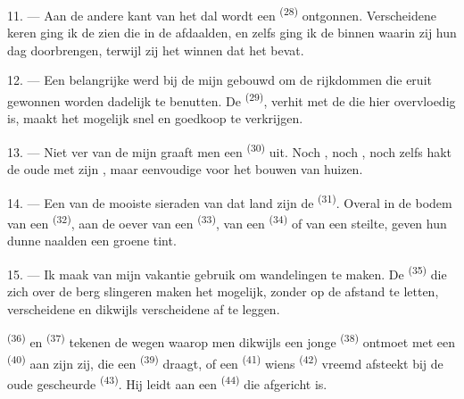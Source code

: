 11. --- Aan de andere kant van het dal wordt een  \textsuperscript{(28)}
ontgonnen. Verscheidene keren ging ik de  zien die in de 
afdaalden, en zelfs ging ik de  binnen waarin zij hun dag doorbrengen, terwijl
zij het  winnen dat het  bevat.

12. --- Een belangrijke  werd bij de mijn gebouwd om de rijkdommen die
eruit gewonnen worden dadelijk te benutten. De
 \textsuperscript{(29)}, verhit met de  die
hier overvloedig is, maakt het mogelijk snel en goedkoop  te verkrijgen.

13. --- Niet ver van de mijn graaft men een  \textsuperscript{(30)} uit.
Noch , noch , noch zelfs  hakt de oude
 met zijn
, maar eenvoudige  voor het bouwen van
huizen.

14. --- Een van de mooiste sieraden van dat land zijn de 
\textsuperscript{(31)}. Overal in de bodem van een  \textsuperscript{(32)}, aan
de oever van een  \textsuperscript{(33)}, van een 
\textsuperscript{(34)} of van een steilte, geven hun dunne naalden een groene tint.

\VUsaut{3.0mm}
\VUsaut{3.0mm}

15. --- Ik maak van mijn vakantie gebruik om  wandelingen te maken. De
 \textsuperscript{(35)} die zich over de berg slingeren maken het mogelijk,
zonder op de afstand te letten, verscheidene  en dikwijls verscheidene
 af te leggen.

 \textsuperscript{(36)} en 
\textsuperscript{(37)} tekenen de wegen waarop men dikwijls een jonge
 \textsuperscript{(38)} ontmoet met een 
\textsuperscript{(40)} aan zijn zij, die een  \textsuperscript{(39)} draagt, of
een  \textsuperscript{(41)} wiens  \textsuperscript{(42)}
vreemd afsteekt bij de oude gescheurde  \textsuperscript{(43)}. Hij leidt aan een
 \textsuperscript{(44)} die afgericht is.

